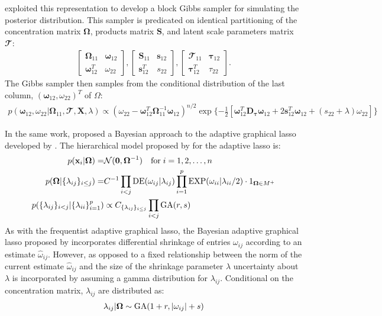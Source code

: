 \cite{wang2012} exploited this representation to develop a block Gibbs sampler for simulating the posterior distribution. This sampler is predicated on identical partitioning of the concentration matrix $\boldsymbol{\Omega}$, products matrix $\boldsymbol{S}$, and latent scale parameters matrix $\mathbfcal{T}$:
\begin{align}
\begin{bmatrix}
\boldsymbol{\Omega}_{11} & \boldsymbol{\omega}_{12} \\
\boldsymbol{\omega}_{12}^T & \omega_{22}
\end{bmatrix},
\begin{bmatrix}
\mathbf{S}_{11} & \mathbf{s}_{12} \\
\mathbf{s}_{12}^T & s_{22}
\end{bmatrix},
\begin{bmatrix}
\mathbfcal{T}_{11} & \boldsymbol{\tau}_{12} \\
\boldsymbol{\tau}_{12}^T & \tau_{22}
\end{bmatrix}.
\end{align}
The Gibbs sampler then samples from the conditional distribution of the last column, $(\boldsymbol{\omega}_{12}, \omega_{22})^T$ of $\Omega$:
\begin{align}
p(\boldsymbol{\omega}_{12}, \omega_{22}|\boldsymbol{\Omega}_{11},\mathbfcal{T},\textbf{X},\lambda) \propto \left(\omega_{22}-\boldsymbol{\omega}_{12}^T \boldsymbol{\Omega}_{11}^{-1}\boldsymbol{\omega}_{12} \right)^{n/2} \exp \{ - \frac{1}{2}\left[ \boldsymbol{\omega}_{12}^T \textbf{D}_{\boldsymbol{\tau}} \boldsymbol{\omega}_{12}+ 2 
\textbf{s}_{12}^T \boldsymbol{\omega}_{12} + (s_{22}+\lambda)\omega_{22}\right] \}
\end{align}

In the same work, \cite{wang2012} proposed a Bayesian approach to the adaptive graphical lasso developed by \cite{fan2009}. The hierarchical model proposed by for the adaptive lasso is:
\begin{align}
p(\mathbf{x}_i|\boldsymbol{\Omega}) = & \mathcal{N}(\mathbf{0,\boldsymbol{\Omega}}^{-1}) \quad \text{for} \; i=1,2,\hdots,n\\
p(\boldsymbol{\Omega}|\{\lambda_{ij}\}_{i\leq j}) = & C^{-1} \prod_{i<j} \operatorname{DE}(\omega_{ij}|\lambda_{ij}) \prod_{i=1}^{p} \operatorname{EXP} (\omega_{ii} | \lambda_{ii} / 2) \cdot 1_{\boldsymbol{\Omega}\in M^+}\\
p(\{\lambda_{ij}\}_{i<j}|\{\lambda_{ii}\}_{i=1}^p) &\propto C_{\{\lambda_{ij}\}_{i\leq j}} \prod_{i<j} \operatorname{GA}(r,s)
\end{align}
As with the frequentist adaptive graphical lasso, the Bayesian adaptive graphical lasso proposed by \cite{wang2012} incorporates differential shrinkage of entries $\omega_{ij}$ according to an estimate $\hat{\omega}_{ij}$. However, as opposed to a fixed relationship between the norm of the current estimate $\hat{\omega}_{ij}$ and the size of the shrinkage parameter $\lambda$ uncertainty about $\lambda$ is incorporated by assuming a gamma distribution for $\lambda_{ij}$. Conditional on the concentration matrix, $\lambda_{ij}$ are distributed as:
\begin{align}
\lambda_{ij}|\boldsymbol{\Omega}\sim \operatorname{GA}(1+r,|\omega_{ij}|+s)
\end{align}

